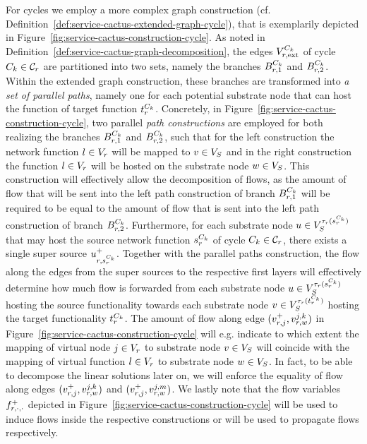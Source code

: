 \documentclass[10pt, conference, letterpaper]{IEEEtran}
\begin{document}
For cycles we employ a more complex graph construction (cf. Definition~\ref{def:service-cactus-extended-graph-cycle}), that is exemplarily depicted in Figure~\ref{fig:service-cactus-construction-cycle}. As noted in Definition~\ref{def:service-cactus-graph-decomposition}, the edges $\VVextcycle$ of cycle $C_k \in \Cycles$ are partitioned into two sets, namely the branches $\VEcycleBranchR$ and $\VEcycleBranchL$. Within the extended graph construction, these branches are transformed into \emph{a set of parallel paths}, namely one for each potential substrate node that can host the function of target function $\VVcycleTarget$. Concretely, in Figure~\ref{fig:service-cactus-construction-cycle}, two parallel \emph{path constructions} are employed for both realizing the branches $\VEcycleBranchR$ and $\VEcycleBranchL$, such that for the left construction the network function $l\in V_{r}$ will be mapped to $v \in V_S$ and in the right construction the function $l \in V_{r}$ will be hosted on the substrate node $w \in V_S$. This construction will effectively allow the decomposition of flows, as the amount 
of flow that will be sent into the left path construction of branch $\VEcycleBranchR$ will be required to be equal to the amount of flow that is sent into the left path construction of branch $\VEcycleBranchL$. Furthermore, for each substrate node $u \in \SVTypes[\Vtype(\VVcycleSource)]$ that may host the source network function $\VVcycleSource$ of cycle $C_k \in \Cycles$, there exists a single super source $u^+_{\req,\VVcycleSource}$. Together with the parallel paths construction, the flow along the edges from the super sources to the respective first layers will effectively determine how much flow is forwarded from each substrate node $u \in \SVTypes[\Vtype(\VVcycleSource)]$ hosting the source functionality towards each substrate node $v \in \SVTypes[\Vtype(\VVcycleTarget)]$ hosting the target functionality $\VVcycleTarget$. The amount of flow along edge $(v^+_{r,j}, v^{j,k}_{r,w})$ in Figure~\ref{fig:service-cactus-construction-cycle} will e.g. indicate to which extent the mapping of virtual node $j \in V_{r}$ to substrate node $v \in V_S$  will coincide with the mapping of virtual function $l \in V_{r}$ to substrate node $w \in V_S$. In fact, to be able to decompose the linear solutions later on, we will enforce the equality of flow along edges  $(v^+_{r,j}, v^{j,k}_{r,w})$ and $(v^+_{r,j}, v^{j,m}_{r,w})$. We lastly note that the flow variables $f^+_{r,\cdot,\cdot}$ depicted in Figure~\ref{fig:service-cactus-construction-cycle} will be used to induce flows inside the respective constructions or will be used to propagate flows respectively. 
\end{document}
